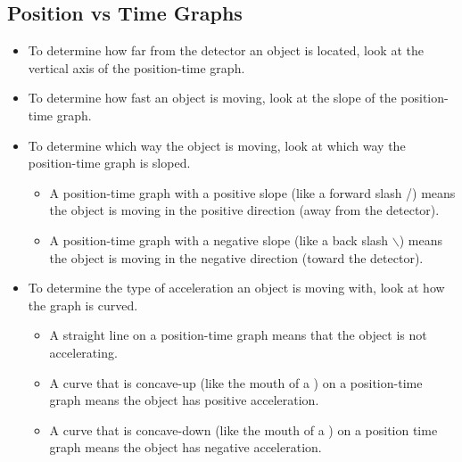 \documentclass[letterpaper, 12pt]{article}
\begin{document}
\subsection*{Position vs Time Graphs}
\begin{itemize}
	\item To determine how far from the detector an object is located, look at the vertical axis of the position-time graph.
	\item To determine how fast an object is moving, look at the slope of the position-time graph.
	\item To determine which way the object is moving, look at which way the position-time graph is sloped.
	\begin{itemize} 
		\item A position-time graph with a positive slope (like a forward slash /) means the object is moving in the positive direction (away from the detector).
		\item A position-time graph with a negative slope (like a back slash $\backslash$)  means the object is moving in the negative direction (toward the detector).
		\end{itemize} 
	\item To determine the type of acceleration an object is moving with, look at how the graph is curved.
	\begin{itemize}
		\item A straight line on a position-time graph means that the object is not accelerating.
		\item A curve that is concave-up (like the mouth of a \smiley) on a position-time graph means the object has positive acceleration.
		\item A curve that is concave-down (like the mouth of a \frownie) on a position time graph means the object has negative acceleration. 
	\end{itemize}
\end{itemize}
\end{document}
